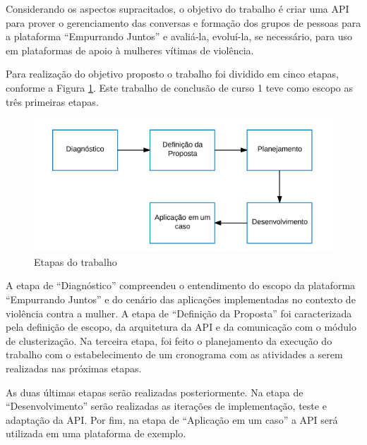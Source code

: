 Considerando os aspectos supracitados, o objetivo do trabalho é criar uma API para prover o gerenciamento das conversas e formação
dos grupos de pessoas para a plataforma ``Empurrando Juntos'' e avaliá-la, evoluí-la, se necessário, para uso 
em plataformas de apoio à mulheres vítimas de violência.



Para realização do objetivo proposto o trabalho foi dividido em cinco etapas, conforme a Figura \ref{fig:etapas_trabalho}. 
Este trabalho de conclusão de curso 1 
teve como escopo as três primeiras etapas.

\begin{figure}[h!]
\centering
\includegraphics[scale=0.6]{figuras/etapas.png}
\caption{Etapas do trabalho}
\label{fig:etapas_trabalho}
\end{figure}

A etapa de ``Diagnóstico'' compreendeu o entendimento do escopo da plataforma ``Empurrando Juntos'' e do cenário das 
aplicações implementadas no contexto de violência contra a mulher. A etapa de ``Definição da Proposta'' foi caracterizada pela definição de escopo, 
da arquitetura da API e da comunicação com o módulo de clusterização. Na terceira etapa, foi feito o planejamento da execução do trabalho com o estabelecimento
de um cronograma com as atividades a serem realizadas nas próximas etapas. 

As duas últimas etapas serão realizadas posteriormente. Na etapa de ``Desenvolvimento''
serão realizadas as iterações de implementação, teste e adaptação da API. Por fim, na etapa de ``Aplicação em um caso'' a API será utilizada em uma 
plataforma de exemplo.


